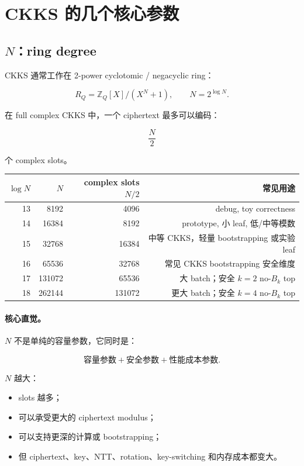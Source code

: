 \documentclass[UTF8,11pt,a4paper]{ctexart}
\begin{document}
\section{CKKS 的几个核心参数}

\subsection{$N$：ring degree}

CKKS 通常工作在 2-power cyclotomic / negacyclic ring：

\[
R_Q = \mathbb{Z}_Q[X]/(X^N+1),
\qquad N=2^{\log N}.
\]

在 full complex CKKS 中，一个 ciphertext 最多可以编码：

\[
\frac{N}{2}
\]

个 complex slots。

\begin{center}
\begin{tabular}{rrrr}
\toprule
$\log N$ & $N$ & complex slots $N/2$ & 常见用途 \\
\midrule
13 & 8192 & 4096 & debug, toy correctness \\
14 & 16384 & 8192 & prototype, 小 leaf, 低/中等模数 \\
15 & 32768 & 16384 & 中等 CKKS，轻量 bootstrapping 或实验 leaf \\
16 & 65536 & 32768 & 常见 CKKS bootstrapping 安全维度 \\
17 & 131072 & 65536 & 大 batch；安全 $k=2$ no-$B_k$ top \\
18 & 262144 & 131072 & 更大 batch；安全 $k=4$ no-$B_k$ top \\
\bottomrule
\end{tabular}
\end{center}

\paragraph{核心直觉。}
$N$ 不是单纯的容量参数，它同时是：

\[
\boxed{
\text{容量参数} + \text{安全参数} + \text{性能成本参数}.
}
\]

$N$ 越大：
\begin{itemize}[leftmargin=2em]
    \item slots 越多；
    \item 可以承受更大的 ciphertext modulus；
    \item 可以支持更深的计算或 bootstrapping；
    \item 但 ciphertext、key、NTT、rotation、key-switching 和内存成本都变大。
\end{itemize}
\end{document}
